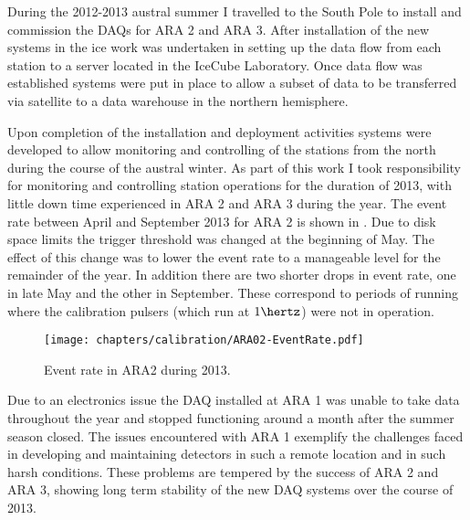 During the 2012-2013 austral summer I travelled to the South Pole to install and commission the DAQs for ARA 2 and ARA 3. After installation of the new systems in the ice work was undertaken in setting up the data flow from each station to a server located in the IceCube Laboratory. Once data flow was established systems were put in place to allow a subset of data to be transferred via satellite to a data warehouse in the northern hemisphere. 

Upon completion of the installation and deployment activities systems were developed to allow monitoring and controlling of the stations from the north during the course of the austral winter. As part of this work I took responsibility for monitoring and controlling station operations for the duration of 2013, with little down time experienced in ARA 2 and ARA 3 during the year. The event rate between April and September 2013 for ARA 2 is shown in . Due to disk space limits the trigger threshold was changed at the beginning of May. The effect of this change was to lower the event rate to a manageable level for the remainder of the year. In addition there are two shorter drops in event rate, one in late May and the other in September. These correspond to periods of running where the calibration pulsers (which run at $1 \hertz$) were not in operation.

\begin{figure}
  \texttt{[image: chapters/calibration/ARA02-EventRate.pdf]}
  \caption{Event rate in ARA2 during 2013.}
  \label{fig:calibration:ARA1-3-development:ARA2-Rate}
\end{figure}

Due to an electronics issue the DAQ installed at ARA 1 was unable to take data throughout the year and stopped functioning around a month after the summer season closed. The issues encountered with ARA 1 exemplify the challenges faced in developing and maintaining detectors in such a remote location and in such harsh conditions. These problems are tempered by the success of ARA 2 and ARA 3, showing long term stability of the new DAQ systems over the course of 2013.






